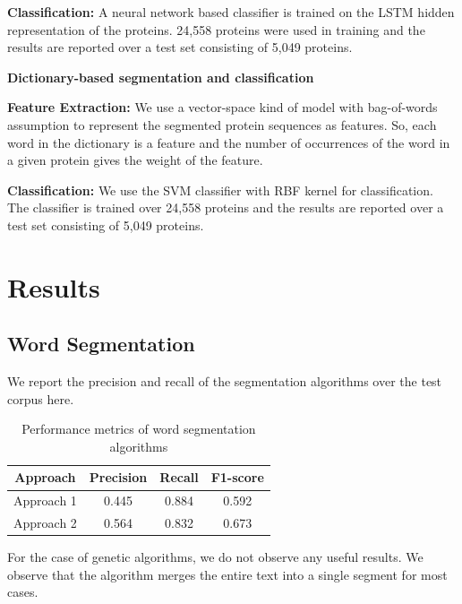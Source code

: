 \documentclass[runningheads]{llncs}
\begin{document}
\textbf{Classification:} A neural network based classifier is trained on the LSTM hidden representation of the proteins. 24,558 proteins were used in training and the results are reported over a test set consisting of 5,049 proteins.
\ \\ \newline

\noindent \textbf{Dictionary-based segmentation and classification}

\textbf{Feature Extraction:} We use a vector-space kind of model with bag-of-words assumption to represent the segmented protein sequences as features. So, each word in the dictionary is a feature and the number of occurrences of the word in a given protein gives the weight of the feature.

\textbf{Classification:} We use the SVM classifier with RBF kernel for classification. The classifier is trained over 24,558 proteins and the results are reported over a test set consisting of 5,049 proteins.


\section{Results}

\subsection{Word Segmentation}

We report the precision and recall of the segmentation algorithms over the test corpus here. 

\begin{table}[H]
\centering
\begin{tabular}{ c | c c c}\hline
\textbf{Approach} & \textbf{Precision} & \textbf{Recall} & \textbf{F1-score} \\ \hline
Approach 1 & 0.445 & 0.884 & 0.592 \\ 
Approach 2 & 0.564 & 0.832 & 0.673 \\ 
\end{tabular}
\caption{Performance metrics of word segmentation algorithms}
\label{tab:perf_word_seg}
\end{table}
For the case of genetic algorithms, we do not observe any useful results. We observe that the algorithm merges the entire text into a single segment for most cases. 
\end{document}
